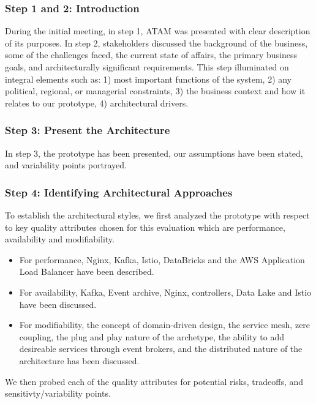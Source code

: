 \documentclass[review]{elsarticle}
\begin{document}
\subsubsection{Step 1 and 2: Introduction}

During the initial meeting, in step 1, ATAM was presented with clear description of its purposes. In step 2, stakeholders discussed the background of the business, some of the challenges faced, the current state of affairs, the primary business goals, and architecturally significant requirements. This step illuminated on integral elements such as: 1) most important functions of the system, 2) any political, regional, or managerial constraints, 3) the business context and how it relates to our prototype, 4) architectural drivers.


\subsubsection{Step 3: Present the Architecture}

In step 3, the prototype has been presented, our assumptions have been stated, and variability points portrayed. 

\subsubsection{Step 4: Identifying Architectural Approaches}

To establish the architectural styles, we first analyzed the prototype with respect to key quality attributes chosen for this evaluation which are performance, availability and modifiability.

\begin{itemize}
    \item For performance, Nginx, Kafka, Istio, DataBricks and the AWS Application Load Balancer have been described.
    \item For availability, Kafka, Event archive, Nginx, controllers, Data Lake and Istio have been discussed.
    \item For modifiability, the concept of domain-driven design, the service mesh, zere coupling, the plug and play nature of the archetype, the ability to add desireable services through event brokers, and the distributed nature of the architecture has been discussed.
\end{itemize}

We then probed each of the quality attributes for potential risks, tradeoffs, and sensitivty/variability points.
\end{document}
